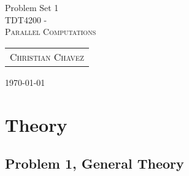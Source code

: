 \documentclass[fontsize=11pt, paper=a4, titlepage]{article}
\begin{document}
\begin{center}

{\huge Problem Set 1}\\[0.5cm]

\textsc{\LARGE TDT4200 -}\\[0.5cm]
\textsc{\large Parallel Computations}\\[1.0cm]

\begin{table}[h]
    \centering
    \begin{tabular}{c}
        \textsc{Christian Chavez}
    \end{tabular}
\end{table}

\end{center}
\vfill
\large{\today}
\clearpage

\section{Theory}
\subsection{Problem 1, General Theory}
\end{document}
